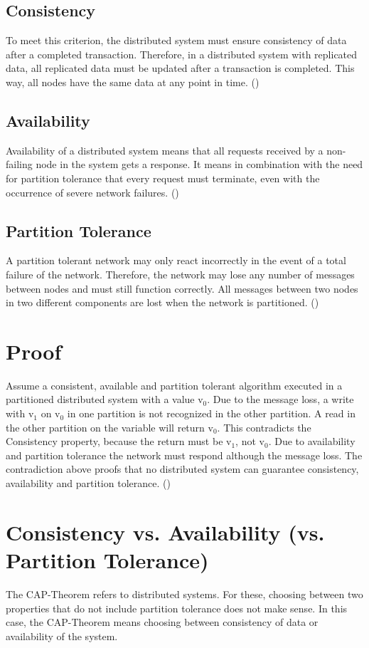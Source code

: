 \subsection*{Consistency}
To meet this criterion, the distributed system must ensure consistency of data after a completed transaction. Therefore, in a distributed system with replicated data, all replicated data must be updated after a transaction is completed. This way, all nodes have the same data at any point in time. (\cite[p.~2ff.]{brewer:2002})
\subsection*{Availability}
Availability of a distributed system means that all requests received by a non-failing node in the system gets a response. It means in combination with the need for partition tolerance that every request must terminate, even with the occurrence of severe network failures. (\cite[p.~3]{brewer:2002})
\subsection*{Partition Tolerance}
A partition tolerant network may only react incorrectly in the event of a total failure of the network. Therefore, the network may lose any number of messages between nodes and must still function correctly. All messages between two nodes in two different components are lost when the network is partitioned. (\cite[p.~3ff.]{brewer:2002})
\pagebreak
\section*{Proof}
Assume a consistent, available and partition tolerant algorithm executed in a partitioned distributed system with a value v$_{0}$. Due to the message loss, a write with v$_{1}$ on v$_{0}$ in one partition is not recognized in the other partition. A read in the other partition on the variable will return v$_{0}$. This contradicts the Consistency property, because the return must be v$_{1}$, not v$_{0}$. Due to availability and partition tolerance the network must respond although the message loss. The contradiction above proofs that no distributed system can guarantee consistency, availability and partition tolerance. (\cite[p.~4ff.]{brewer:2002})
\section*{Consistency vs. Availability (vs. Partition Tolerance)}
The \ac{CAP}-Theorem refers to distributed systems. For these, choosing between two properties that do not include partition tolerance does not make sense. In this case, the \ac{CAP}-Theorem means choosing between consistency of data or availability of the system.
